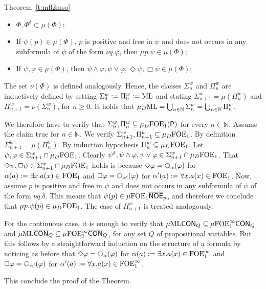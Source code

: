 \begin{proofof}{Theorem~\ref{t:mfl2mso}}
\begin{itemize}
\item $\Phi, \Phi^\delta \subset \mu(\Phi)$;
\item If $\psi(p) \in \mu(\Phi)$,  $p$ is positive and free in $\psi$ and does not occurs in any subformula of $\psi$ of the form $\nu q. \varphi$, then $\mu p. \psi \in \mu(\Phi)$;
\item If $\psi, \varphi \in \mu(\Phi)$, then $\psi \land \varphi, \psi \lor \varphi, \Diamond \psi, \Box \psi \in \mu(\Phi)$;
\end{itemize}
The set $\nu(\Phi)$ is defined analogously. Hence, the classes $\Sigma^w_{n}$ and $\Pi^w_{n}$ are inductively defined by setting $\Sigma^w_{0}:=\Pi^w_{0}:=\mathrm{ML}$ and stating $\Sigma^w_{n+1}=\mu(\Pi^w_{n})$
and $\Pi^w_{n+1}= \nu(\Sigma^w_{n})$, for $n\geq 0$.
%
It holds that $\mu_{D}\mathrm{ML}=\bigcup_{n \in \mathbb{N}}\Sigma^w_{n}=\bigcup_{n \in \mathbb{N}}\Pi^w_{n}$. 

We therefore have to verify that $\Sigma^w_{n}, \Pi^w_{n}\subseteq \mu_{D}\mathrm{FOE}_1(\mathsf{P})$ for every $n \in \mathbb{N}$. Assume the claim true for $n \in \mathbb{N}$. We verify $\Sigma^w_{n+1},\Pi^w_{n+1}\subseteq \mu_{D}\mathrm{FOE}_1$. By definition $\Sigma^w_{n+1}=\mu(\Pi^w_{n})$. By induction hypothesis $\Pi^w_{n}\subseteq \mu_{D}\mathrm{FOE}_1$. Let $\psi, \varphi \in \Sigma^w_{n+1} \cap \mu_{D}\mathrm{FOE}_1$. Clearly $\psi^\delta, \psi \land \varphi, \psi \lor \varphi \in \Sigma^w_{n+1} \cap \mu_{D}\mathrm{FOE}_1$. That $\Diamond \psi, \Box \psi \in \Sigma^w_{n+1} \cap \mu_{D}\mathrm{FOE}_1 $ holds is because $\Diamond \varphi = \nxt{\al}(\varphi)$ for $\alpha(a):=\exists x.a(x) \in \mathrm{FOE}_1$ and $\Box \varphi = \nxt{\al'}(\varphi)$ for $\alpha'(a):=\forall x.a(x) \in \mathrm{FOE}_1$.
Now, assume $p$ is positive and free in $\psi$ and does not occurs in any subformula of $\psi$ of the form $\nu q. \delta$. This means that $\psi(p) \in \mu\mathrm{FOE}_1\overline{\mathsf{NOE}}_{p}$, and therefore we conclude that $\mu p.\psi(p) \in \mu_{D}\mathrm{FOE}_1$. The case of $\Pi^w_{n+1}$ is treated analogously.

For the continuous case, it is enough to verify that $\mu\mathrm{ML}\mathsf{CON}_{Q}\subseteq\mu\mathrm{FOE}^{\infty}_1\mathsf{CON}_{Q}$ and $\mu\mathrm{ML}\overline{\mathsf{CON}}_{Q}\subseteq\mu\mathrm{FOE}^{\infty}_1\overline{\mathsf{CON}}_{Q}$, for any set $Q$ of propositional variables. But this follows by a straightforward induction on the structure of a formula by noticing as before that $\Diamond \varphi = \nxt{\al}(\varphi)$ for $\alpha(a):=\exists x.a(x) \in \mathrm{FOE}^{\infty}_1$ and $\Box \varphi = \nxt{\al'}(\varphi)$ for $\alpha'(a):=\forall x.a(x) \in \mathrm{FOE}^{\infty}_1$.

This conclude the proof of the Theorem.
\end{proofof}

